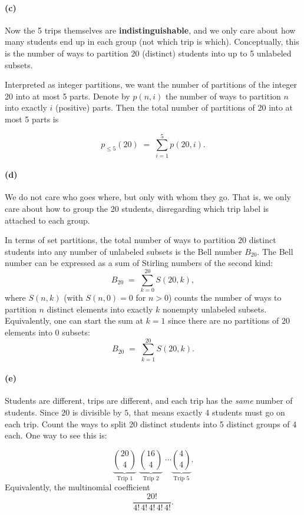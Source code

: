 \documentclass[docmute]{article}
\begin{document}
\paragraph{(c)}
Now the 5 trips themselves are \textbf{indistinguishable}, and we only care about how many students end up in each group (not which trip is which). Conceptually, this is the number of ways to partition 20 (distinct) students into up to 5 unlabeled subsets.

Interpreted as integer partitions, we want the number of partitions of the integer 20 into at most 5 parts. Denote by \(p(n, i)\) the number of ways to partition \(n\) into exactly \(i\) (positive) parts. Then the total number of partitions of 20 into at most 5 parts is

\[
p_{\le 5}(20) \;=\; \sum_{i=1}^{5} p(20, i).
\]


\paragraph{(d)}
We do not care who goes where, but only with whom they go. That is, we only care about how to group the 20 students, disregarding which trip label is attached to each group.

In terms of set partitions, the total number of ways to partition \(20\) distinct students into any number of unlabeled subsets is the Bell number \(B_{20}\). The Bell number can be expressed as a sum of Stirling numbers of the second kind:
\[
B_{20} 
\;=\; 
\sum_{k=0}^{20} S(20, k),
\]
where \(S(n, k)\) (with \(S(n, 0) = 0\) for \(n>0\)) counts the number of ways to partition \(n\) distinct elements into exactly \(k\) nonempty unlabeled subsets. Equivalently, one can start the sum at \(k=1\) since there are no partitions of 20 elements into 0 subsets:
\[
B_{20} 
\;=\; 
\sum_{k=1}^{20} S(20, k).
\]

\paragraph{(e)} 
Students are different, trips are different, and each trip has the \emph{same} number of students. Since \(20\) is divisible by \(5\), that means exactly 4 students must go on each trip. Count the ways to split 20 distinct students into 5 distinct groups of 4 each. One way to see this is:

\[
\underbrace{\binom{20}{4}}_{\text{Trip 1}} \;
\underbrace{\binom{16}{4}}_{\text{Trip 2}} \; 
\cdots 
\underbrace{\binom{4}{4}}_{\text{Trip 5}}.
\]
Equivalently, the multinomial coefficient
\[
\frac{20!}{4!\,4!\,4!\,4!\,4!}.
\]
\end{document}
